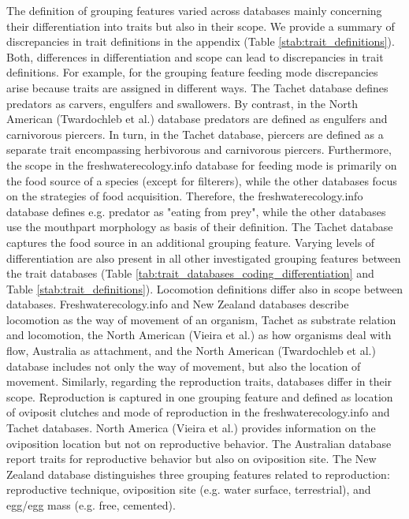 \documentclass{article}
\begin{document}
The definition of grouping features varied across databases mainly concerning their differentiation into traits but also in their scope. We provide a summary of discrepancies in trait definitions in the appendix (Table \ref{stab:trait_definitions}). Both, differences in differentiation and scope can lead to discrepancies in trait definitions. For example, for the grouping feature feeding mode discrepancies arise because traits are assigned in different ways. The Tachet database defines predators as carvers, engulfers and swallowers. By contrast, in the North American (Twardochleb et al.) database predators are defined as engulfers and carnivorous piercers. In turn, in the Tachet database, piercers are defined as a separate trait encompassing herbivorous and carnivorous piercers. Furthermore, the scope in the freshwaterecology.info database for feeding mode is primarily on the food source of a species (except for filterers), while the other databases focus on the strategies of food acquisition. Therefore, the freshwaterecology.info database defines e.g. predator as "eating from prey", while the other databases use the mouthpart morphology as basis of their definition. The Tachet database captures the food source in an additional grouping feature. Varying levels of differentiation are also present in all other investigated grouping features between the trait databases (Table \ref{tab:trait_databases_coding_differentiation} and Table \ref{stab:trait_definitions}). Locomotion definitions differ also in scope between databases. Freshwaterecology.info and New Zealand databases describe locomotion as the way of movement of an organism, Tachet as substrate relation and locomotion, the North American (Vieira et al.) as how organisms deal with flow, Australia as attachment, and the North American (Twardochleb et al.) database includes not only the way of movement, but also the location of movement. Similarly, regarding the reproduction traits, databases differ in their scope. Reproduction is captured in one grouping feature and defined as location of oviposit clutches and mode of reproduction in the freshwaterecology.info and Tachet databases. North America (Vieira et al.) provides information on the oviposition location but not on reproductive behavior. The Australian database report traits for reproductive behavior but also on oviposition site. The New Zealand database distinguishes three grouping features related to reproduction: reproductive technique, oviposition site (e.g. water surface, terrestrial), and egg/egg mass (e.g. free, cemented).
\end{document}
